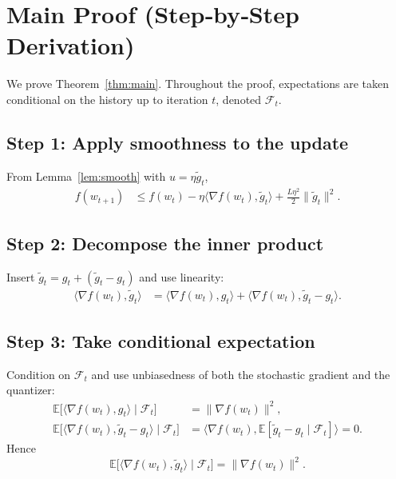 \documentclass{article}
\newcommand{\E}{\mathbb{E}}
\begin{document}
\section*{Main Proof (Step‑by‑Step Derivation)}
We prove Theorem~\ref{thm:main}. Throughout the proof, expectations are taken conditional on the history up to iteration $t$, denoted $\mathcal{F}_t$.

\subsection*{Step 1: Apply smoothness to the update}
From Lemma~\ref{lem:smooth} with $u=\eta\tilde g_t$,
\begin{align}
    f(w_{t+1})
    &\le f(w_t)-\eta\langle\nabla f(w_t),\tilde g_t\rangle
      +\frac{L\eta^2}{2}\|\tilde g_t\|^2 .
    \tag{Step 1}
\end{align}

\subsection*{Step 2: Decompose the inner product}
Insert $\tilde g_t = g_t + (\tilde g_t-g_t)$ and use linearity:
\begin{align}
    \langle\nabla f(w_t),\tilde g_t\rangle
    &=\langle\nabla f(w_t),g_t\rangle
      +\langle\nabla f(w_t),\tilde g_t-g_t\rangle .
    \tag{Step 2}
\end{align}

\subsection*{Step 3: Take conditional expectation}
Condition on $\mathcal{F}_t$ and use unbiasedness of both the stochastic gradient and the quantizer:
\begin{align}
    \E\!\bigl[\langle\nabla f(w_t),g_t\rangle\mid\mathcal{F}_t\bigr]
    &=\|\nabla f(w_t)\|^2 ,\\[0.2em]
    \E\!\bigl[\langle\nabla f(w_t),\tilde g_t-g_t\rangle\mid\mathcal{F}_t\bigr]
    &=\langle\nabla f(w_t),\E[\tilde g_t-g_t\mid\mathcal{F}_t]\rangle=0 .
    \tag{Step 3}
\end{align}
Hence
\[
    \E\!\bigl[\langle\nabla f(w_t),\tilde g_t\rangle\mid\mathcal{F}_t\bigr]
    =\|\nabla f(w_t)\|^2 .
\]
\end{document}
